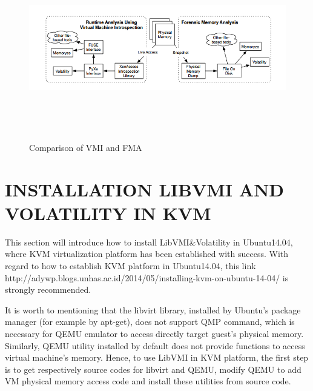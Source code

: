 \begin{figure}[htbp]
	\centering
		\includegraphics[width=14cm, height= 8cm ]{Figures/Figure20.png}
	\caption[Comparison of VMI and FMA]{Comparison of VMI and FMA}
	\label{fig:Comparison of VMI and FMA}
\end{figure}

\section{INSTALLATION LIBVMI AND VOLATILITY IN KVM}
This section will introduce how to install LibVMI\&Volatility in Ubuntu14.04, where KVM virtualization platform has been 
established with success. With regard to how to establish KVM platform in Ubuntu14.04, this link 
http://adywp.blogs.unhas.ac.id/2014/05/installing-kvm-on-ubuntu-14-04/ is strongly recommended.

It is worth to mentioning that the libvirt library, installed by Ubuntu's package manager (for example by apt-get), 
does not support QMP command, which is necessary for QEMU emulator to access directly target guest's physical memory. 
Similarly, QEMU utility installed by default does not provide functions to access virtual machine's memory. Hence, 
to use LibVMI in KVM platform, the first step is to get respectively source codes for libvirt and QEMU, modify QEMU to add 
VM physical memory access code and install these utilities from source code.

